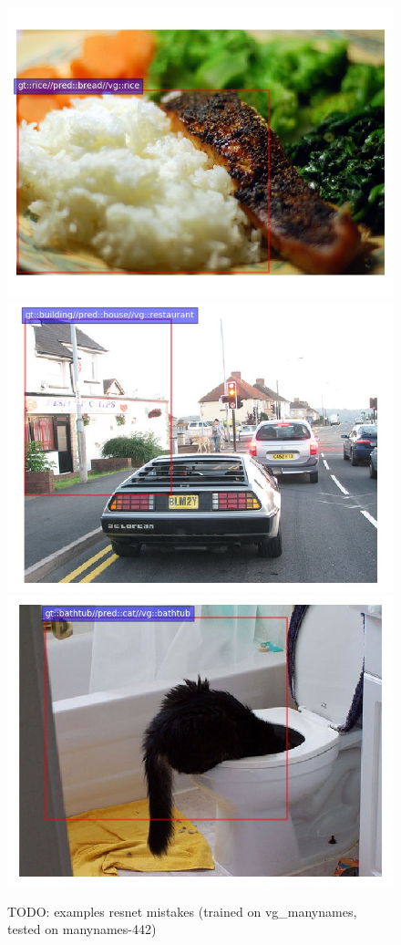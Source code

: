 \iffalse
\begin{figure}
	\centering
	\includegraphics[scale=.2]{images/2323938.jpg}
	\includegraphics[scale=.2]{images/2322259.jpg}
	\includegraphics[scale=.2]{images/2371657.jpg}
	
	\caption{TODO: examples resnet mistakes (trained on vg\_manynames, tested on manynames-442)\label{fig:mistakes} }
\end{figure}

